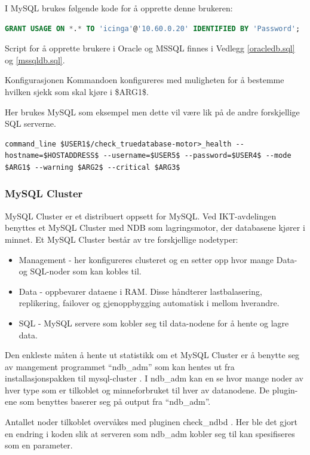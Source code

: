 I MySQL brukes følgende kode for å opprette denne brukeren:
\begin{lstlisting}[language=SQL]
GRANT USAGE ON *.* TO 'icinga'@'10.60.0.20' IDENTIFIED BY 'Password'; 
\end{lstlisting}

Script for å opprette brukere i Oracle og MSSQL finnes i Vedlegg \ref{oracledb.sql} og \ref{mssqldb.sql}.

Konfigurasjonen
Kommandoen konfigureres med muligheten for å bestemme hvilken sjekk som skal kjøre i \$ARG1\$.

Her brukes MySQL som eksempel men dette vil være lik på de andre forskjellige SQL serverne. 
\begin{lstlisting}
command_line $USER1$/check_truedatabase-motor>_health --hostname=$HOSTADDRESS$ --username=$USER5$ --password=$USER4$ --mode $ARG1$ --warning $ARG2$ --critical $ARG3$
\end{lstlisting}
\subsubsection{MySQL Cluster}

MySQL Cluster er et distribuert oppsett for MySQL. Ved IKT-avdelingen benyttes et MySQL Cluster med NDB som lagringsmotor, der databasene kjører i minnet. Et MySQL Cluster består av tre forskjellige nodetyper:

\begin{itemize}
	\item Management - her konfigureres clusteret og en setter opp hvor mange Data- og SQL-noder som kan kobles til.
	\item Data - oppbevarer dataene i RAM. Disse håndterer lastbalasering, replikering, failover og gjenoppbygging automatisk i mellom hverandre.
	\item SQL - MySQL servere som kobler seg til data-nodene for å hente og lagre data.
\end{itemize}

Den enkleste måten å hente ut statistikk om et MySQL Cluster er å benytte seg av mangement programmet “ndb\_adm” som kan hentes ut fra installasjonspakken til mysql-cluster \cite{ndbdownload}. I ndb\_adm kan en se hvor mange noder av hver type som er tilkoblet og minneforbruket til hver av datanodene. De plugin-ene som benyttes baserer seg på output fra “ndb\_adm”.

Antallet noder tilkoblet overvåkes med pluginen check\_ndbd \cite{ndbnode}. Her ble det gjort en endring i koden slik at serveren som ndb\_adm kobler seg til kan spesifiseres som en parameter.

